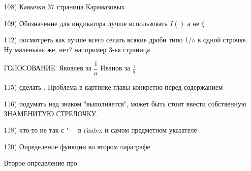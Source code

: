 108) Кавычки 37 страница Карамазовых

109) Обозначение для индикатора лучше использовать $I()$ а не $\xi$

112) посмотреть как лучше всего селать всякие дроби типо 1/a  в одной строчке. Ну маленькая же, нет? напиример 3-ья страница.

ГОЛОСОВАНИЕ: 
Яковлев за $\dfrac{1}{a}$
Иванов за $\frac{1}{a}$

115) сделать . Проблема в картинке главы конкретно перед содержанием

116) подумать над знаком "выполняется", может быть стоит ввести собственную ЗНАМЕНИТУЮ СТРЕЛОЧКУ.

118) что-то не так с "--~ в rindex и самом предметном указателе

120) Определение функции во втором параграфе 

Второе определение про 
\begin{defnn}
\end{defnn}